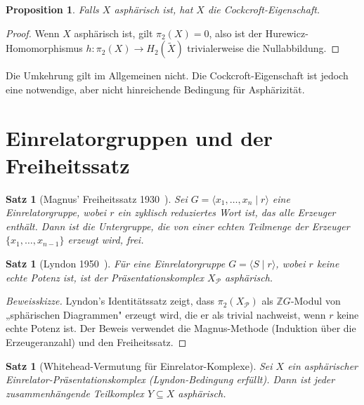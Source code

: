 \documentclass[12pt,a4paper]{amsart}
\newtheorem{proposition}[theorem]{Proposition}
\newtheorem{satz}[theorem]{Satz}
\theoremstyle{definition}
\theoremstyle{remark}
\newcommand{\Z}{\mathbb{Z}}
\begin{document}
\begin{proposition}
Falls $X$ asphärisch ist, hat $X$ die Cockcroft-Eigenschaft.
\end{proposition}

\begin{proof}
Wenn $X$ asphärisch ist, gilt $\pi_2(X) = 0$, also ist der Hurewicz-Homo\-morphismus
$h \colon \pi_2(X) \to H_2(\widetilde{X})$ trivialerweise die Nullabbildung.
\end{proof}

Die Umkehrung gilt im Allgemeinen nicht. Die Cockcroft-Eigenschaft ist jedoch
eine notwendige, aber nicht hinreichende Bedingung für Asphärizität.

\section{Einrelatorgruppen und der Freiheitssatz}

\begin{satz}[Magnus' Freiheitssatz 1930~\cite{Magnus1930}]
Sei $G = \langle x_1, \ldots, x_n \mid r \rangle$ eine Einrelatorgruppe,
wobei $r$ ein zyklisch reduziertes Wort ist, das alle Erzeuger enthält.
Dann ist die Untergruppe, die von einer echten Teilmenge der Erzeuger
$\{x_1, \ldots, x_{n-1}\}$ erzeugt wird, frei.
\end{satz}

\begin{satz}[Lyndon 1950~\cite{Lyndon1950}]
Für eine Einrelatorgruppe $G = \langle S \mid r \rangle$, wobei $r$
keine echte Potenz ist, ist der Präsentationskomplex $X_{\mathcal{P}}$
asphärisch.
\end{satz}

\begin{proof}[Beweisskizze]
Lyndon's Identitätssatz zeigt, dass $\pi_2(X_{\mathcal{P}})$ als
$\Z G$-Modul von „sphärischen Diagrammen" erzeugt wird, die er als
trivial nachweist, wenn $r$ keine echte Potenz ist. Der Beweis verwendet
die Magnus-Methode (Induktion über die Erzeugeranzahl) und den Freiheitssatz.
\end{proof}

\begin{satz}[Whitehead-Vermutung für Einrelator-Komplexe]
Sei $X$ ein asphärischer Einrelator-Präsentationskomplex (Lyndon-Bedingung
erfüllt). Dann ist jeder zusammenhängende Teilkomplex $Y \subseteq X$
asphärisch.
\end{satz}
\end{document}
